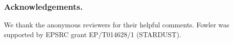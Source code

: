 \documentclass[runningheads]{llncs}
\begin{document}
\begin{credits}

\subsubsection{\discintname}
\end{credits}
%
%

\subsubsection*{Acknowledgements.}
We thank the anonymous reviewers for their helpful comments.
Fowler was supported by EPSRC grant EP/T014628/1 (STARDUST).

\newpage





\ifappendix

\clearpage

\appendix

\ifartefact



\fi



\fi
\end{document}
